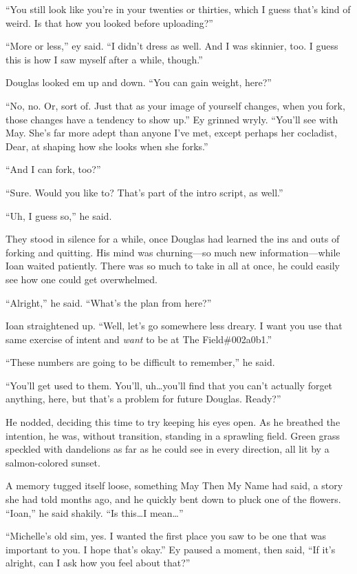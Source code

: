 ``You still look like you're in your twenties or thirties, which I guess that's kind of weird. Is that how you looked before uploading?''

``More or less,'' ey said. ``I didn't dress as well. And I was skinnier, too. I guess this is how I saw myself after a while, though.''

Douglas looked em up and down. ``You can gain weight, here?''

``No, no. Or, sort of. Just that as your image of yourself changes, when you fork, those changes have a tendency to show up.'' Ey grinned wryly. ``You'll see with May. She's far more adept than anyone I've met, except perhaps her cocladist, Dear, at shaping how she looks when she forks.''

``And I can fork, too?''

``Sure. Would you like to? That's part of the intro script, as well.''

``Uh, I guess so,'' he said.

They stood in silence for a while, once Douglas had learned the ins and outs of forking and quitting. His mind was churning---so much new information---while Ioan waited patiently. There was so much to take in all at once, he could easily see how one could get overwhelmed.

``Alright,'' he said. ``What's the plan from here?''

Ioan straightened up. ``Well, let's go somewhere less dreary. I want you use that same exercise of intent and \emph{want} to be at The Field\#002a0b1.''

``These numbers are going to be difficult to remember,'' he said.

``You'll get used to them. You'll, uh\ldots you'll find that you can't actually forget anything, here, but that's a problem for future Douglas. Ready?''

He nodded, deciding this time to try keeping his eyes open. As he breathed the intention, he was, without transition, standing in a sprawling field. Green grass speckled with dandelions as far as he could see in every direction, all lit by a salmon-colored sunset.

A memory tugged itself loose, something May Then My Name had said, a story she had told months ago, and he quickly bent down to pluck one of the flowers. ``Ioan,'' he said shakily. ``Is this\ldots I mean\ldots{}''

``Michelle's old sim, yes. I wanted the first place you saw to be one that was important to you. I hope that's okay.'' Ey paused a moment, then said, ``If it's alright, can I ask how you feel about that?''


